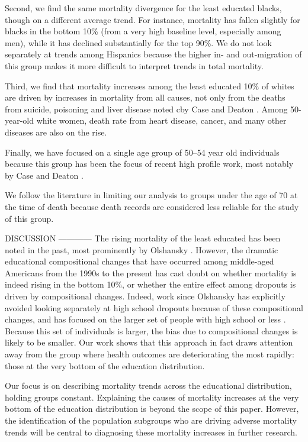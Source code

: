 \begin{center}
Second, we find the same mortality divergence for the least educated
blacks, though on a different average trend. For instance, mortality
has fallen slightly for blacks in the bottom 10\% (from a very high
baseline level, especially among men), while it has declined
substantially for the top 90\%.  We do not look separately at trends
among Hispanics because the higher in- and out-migration of this group
makes it more difficult to interpret trends in total
mortality.

Third, we find that mortality increases among the least educated 10\%
of whites are driven by increases in mortality from all causes, not
only from the deaths from suicide, poisoning and liver disease noted
cby Case and Deaton \cite{Case2015,Case2017}. Among 50-year-old white
women, death rate from heart disease, cancer, and many other diseases
are also on the rise.

 Finally, we
have focused on a single age group of 50--54 year old individuals
because this group has been the focus of recent high profile work,
most notably by Case and Deaton \cite{Case2015,Case2017}. 

We follow the literature in limiting our
analysis to groups under the age of 70 at the time of death because
death records are considered less reliable for the study of this group.



DISCUSSION
------------
The rising mortality of the least educated has been noted in the past,
most prominently by Olshansky \cite{Olshansky2012}. However, the
dramatic educational compositional changes that have occurred among
middle-aged Americans from the 1990s to the present has cast doubt on
whether mortality is indeed rising in the bottom 10\%, or whether the
entire effect among dropouts is driven by compositional
changes. Indeed, work since Olshansky has explicitly avoided looking
separately at high school dropouts because of these compositional
changes, and has focused on the larger set of people with high school
or less \cite{Cutler2011,Case2015,Case2017}. Because this set of
individuals is larger, the bias due to compositional changes is likely
to be smaller. Our work shows that this approach in fact draws
attention away from the group where health outcomes are deteriorating
the most rapidly: those at the very bottom of the education
distribution.

Our focus is on describing mortality trends across the educational
distribution, holding groups constant. Explaining the causes of
mortality increases at the very bottom of the education distribution
is beyond the scope of this paper. However, the identification of the
population subgroups who are driving adverse mortality trends will be
central to diagnosing these mortality increases in further research.




\end{center}
